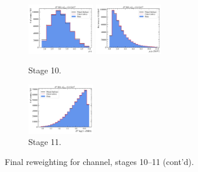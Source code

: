 \begin{figure}[htb]
    \begin{subfigure}{\textwidth}
        \centering
        \includegraphics[width=0.32\textwidth]{./figs-mc-correction/reweighting-final/plot_step9-D0_iso-mu_eta.pdf}
        \includegraphics[width=0.32\textwidth]{./figs-mc-correction/reweighting-final/plot_step9-D0_iso-mu_pt.pdf}
        \caption{Stage 10.}
    \end{subfigure}

    \begin{subfigure}{\textwidth}
        \centering
        \includegraphics[width=0.32\textwidth]{./figs-mc-correction/reweighting-final/plot_step10-D0_iso-d0_comp2.pdf}
        \caption{Stage 11.}
    \end{subfigure}

    \caption{Final reweighting for \Dz channel, stages 10--11 (cont'd).}
    \label{fig:final-rwt-d0-idx3}
\end{figure}


